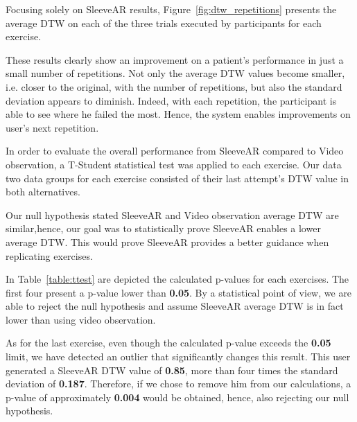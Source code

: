 Focusing solely on SleeveAR results, Figure~\ref{fig:dtw_repetitions} presents the average DTW on each of the three trials executed by participants for each exercise. 

These results clearly show an improvement on a patient's performance in just a small number of repetitions. 
Not only the average DTW values become smaller, i.e. closer to the original, with the number of repetitions, but also the standard deviation appears to diminish. 
Indeed, with each repetition, the participant is able to see where he failed the most. Hence,
the system enables improvements on user's next repetition.




In order to evaluate the overall performance from SleeveAR compared to Video observation, a T-Student statistical test was applied to each exercise. Our data two data groups for each exercise consisted of their last attempt's DTW value in both alternatives.

Our null hypothesis stated SleeveAR and Video observation average DTW are similar,hence, our goal was to statistically prove SleeveAR enables a lower average DTW. This would prove SleeveAR provides a better guidance when replicating exercises.

In Table~\ref{table:ttest} are depicted the calculated p-values for each exercises.
The first four present a p-value lower than \textbf{0.05}. 
By a statistical point of view, we are able to reject the null hypothesis and assume SleeveAR average DTW is in fact lower than using video observation.

As for the last exercise, even though the calculated p-value exceeds the \textbf{0.05} limit, we have detected an outlier that significantly changes this result.
This user generated a SleeveAR DTW value of \textbf{0.85}, more than four times the standard deviation of \textbf{0.187}. 
Therefore, if we chose to remove him from our calculations, a p-value of approximately \textbf{0.004} would be obtained, hence, also rejecting our null hypothesis.


